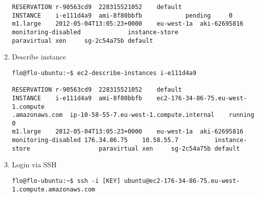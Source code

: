 \documentclass{article}
\begin{document}
\begin{enumerate}
\begin{verbatim}
RESERVATION	r-90563cd9	228315521052	default
INSTANCE	i-e111d4a9	ami-8f80bbfb			pending		0		m1.large	2012-05-04T13:05:23+0000	eu-west-1a	aki-62695816			monitoring-disabled				instance-store					paravirtual	xen		sg-2c54a75b	default
\end{verbatim}

\item Describe instance
\begin{verbatim}
flo@flo-ubuntu:~$ ec2-describe-instances i-e111d4a9

RESERVATION	r-90563cd9	228315521052	default
INSTANCE	i-e111d4a9	ami-8f80bbfb	ec2-176-34-86-75.eu-west-1.compute
.amazonaws.com	ip-10-58-55-7.eu-west-1.compute.internal	running		0		
m1.large	2012-05-04T13:05:23+0000	eu-west-1a	aki-62695816			
monitoring-disabled	176.34.86.75	10.58.55.7			instance-
store					paravirtual	xen		sg-2c54a75b	default
\end{verbatim}


	\item Login via SSH
\begin{verbatim}
flo@flo-ubuntu:~$ ssh -i [KEY] ubuntu@ec2-176-34-86-75.eu-west-
1.compute.amazonaws.com
\end{verbatim}
\end{enumerate}
\end{document}
